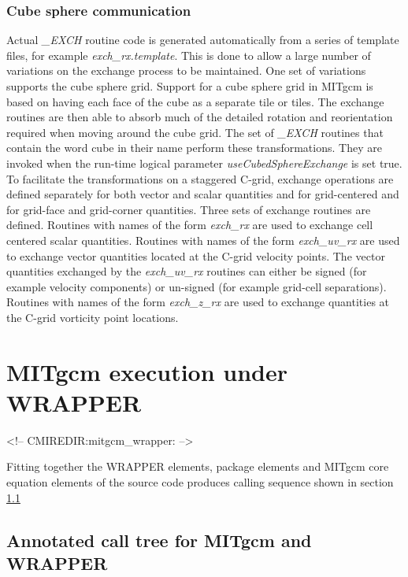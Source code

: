 \subsubsection{Cube sphere communication}
\label{sec:cube_sphere_communication}
Actual {\em \_EXCH} routine code is generated automatically from a
series of template files, for example {\em exch\_rx.template}.  This
is done to allow a large number of variations on the exchange process
to be maintained. One set of variations supports the cube sphere grid.
Support for a cube sphere grid in MITgcm is based on having each face
of the cube as a separate tile or tiles.  The exchange routines are
then able to absorb much of the detailed rotation and reorientation
required when moving around the cube grid. The set of {\em \_EXCH}
routines that contain the word cube in their name perform these
transformations.  They are invoked when the run-time logical parameter
{\em useCubedSphereExchange} is set true. To facilitate the
transformations on a staggered C-grid, exchange operations are defined
separately for both vector and scalar quantities and for grid-centered
and for grid-face and grid-corner quantities.  Three sets of exchange
routines are defined. Routines with names of the form {\em exch\_rx}
are used to exchange cell centered scalar quantities. Routines with
names of the form {\em exch\_uv\_rx} are used to exchange vector
quantities located at the C-grid velocity points. The vector
quantities exchanged by the {\em exch\_uv\_rx} routines can either be
signed (for example velocity components) or un-signed (for example
grid-cell separations).  Routines with names of the form {\em
  exch\_z\_rx} are used to exchange quantities at the C-grid vorticity
point locations.




\section{MITgcm execution under WRAPPER}
\begin{rawhtml}
<!-- CMIREDIR:mitgcm_wrapper: -->
\end{rawhtml}

Fitting together the WRAPPER elements, package elements and
MITgcm core equation elements of the source code produces calling
sequence shown in section \ref{sec:calling_sequence}

\subsection{Annotated call tree for MITgcm and WRAPPER}
\label{sec:calling_sequence}

